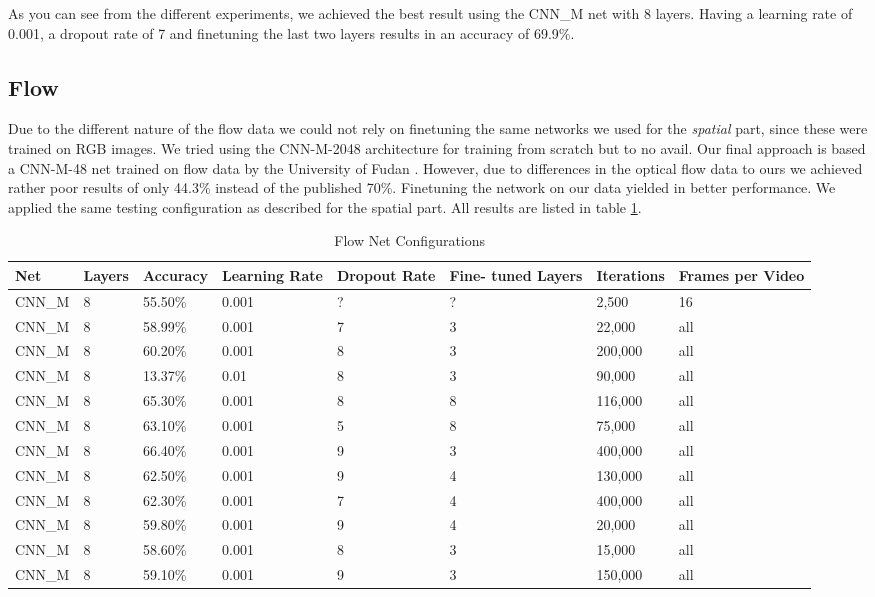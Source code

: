 As you can see from the different experiments, we achieved the best result using the CNN\_M net with 8 layers.
Having a learning rate of 0.001, a dropout rate of 7 and finetuning the last two layers results in an accuracy of 69.9\%.

\subsection{Flow}
\label{subsec:flow}
Due to the different nature of the flow data we could not rely on finetuning the same networks we used for the \emph{spatial} part, since these were trained on RGB images.
We tried using the CNN-M-2048 architecture for training from scratch but to no avail.
Our final approach is based a CNN-M-48 net trained on flow data by the University of Fudan \cite{wu2015modeling}.
However, due to differences in the optical flow data to ours we achieved rather poor results of only 44.3\% instead of the published 70\%.
Finetuning the network on our data yielded in better performance.
We applied the same testing configuration as described for the spatial part.
All results are listed in table \ref{table:flow_results}.

\begin{table}[H]
\centering
\caption{Flow Net Configurations}
\label{table:flow_results}
\begin{tabularx}{\textwidth}{XXXXXXXX}
\toprule
Net 		& Layers	& Accuracy	& Learning Rate 	& Dropout Rate	& Fine- tuned Layers	& Iterations	& Frames per Video \\ \midrule

CNN\_M & 8 & 55.50\%  & 0.001 & ? & ? &   2,500 & 16\\
CNN\_M & 8 & 58.99\%  & 0.001 & 7 & 3 &  22,000 & all \\
CNN\_M & 8 & 60.20\%  & 0.001 & 8 & 3 & 200,000 & all \\
CNN\_M & 8 & 13.37\%  & 0.01  & 8 & 3 &  90,000 & all \\
CNN\_M & 8 & 65.30\%  & 0.001 & 8 & 8 & 116,000 & all \\
CNN\_M & 8 & 63.10\%  & 0.001 & 5 & 8 &  75,000 & all \\
CNN\_M & 8 & 66.40\%  & 0.001 & 9 & 3 & 400,000 & all \\
CNN\_M & 8 & 62.50\%  & 0.001 & 9 & 4 & 130,000 & all \\
CNN\_M & 8 & 62.30\%  & 0.001 & 7 & 4 & 400,000 & all \\
CNN\_M & 8 & 59.80\%  & 0.001 & 9 & 4 &  20,000 & all \\
CNN\_M & 8 & 58.60\%  & 0.001 & 8 & 3 &  15,000 & all \\
CNN\_M & 8 & 59.10\%  & 0.001 & 9 & 3 & 150,000 & all \\

\bottomrule
\end{tabularx}
\end{table}

